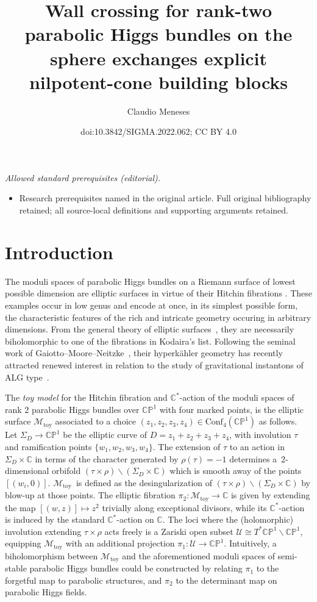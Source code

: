 \documentclass[10pt,a4paper]{amsart}
\title{Wall crossing for rank-two parabolic Higgs bundles on the sphere exchanges explicit nilpotent-cone building blocks}
\author{Claudio Meneses}
\date{doi:10.3842/SIGMA.2022.062; CC BY 4.0}
\newcommand{\field}[1]{\ensuremath{\mathbb{#1}}}
\newcommand{\CC}{\field{C}}
\newcommand{\PP}{\field{P}}
\newcommand{\curly}[1]{\mathscr{#1}}
\newcommand{\cM}{\curly{M}}
\newcommand{\cU}{\curly{U}}
\numberwithin{equation}{section}
\begin{document}
\maketitle
\noindent\textit{Allowed standard prerequisites (editorial).}\begin{itemize}
\item Research prerequisites named in the original article. Full original bibliography retained; all source-local definitions and supporting arguments retained.
\end{itemize}\medskip
\section{Introduction}

The moduli spaces of parabolic Higgs bundles on a Riemann surface of lowest possible dimension are elliptic surfaces in virtue of their Hitchin fibrations \cite{Hit87a}. These examples occur in low genus and encode at once, in its simplest possible form, the characteristic features of the rich and intricate geometry occuring in arbitrary dimensions. From the general theory of elliptic surfaces~\cite{Mir89}, they are necessarily biholomorphic to one of the fibrations in Kodaira's list. Following the seminal work of Gaiotto--Moore--Neitzke~\cite{GMN13}, their hyperk\"ahler geometry has recently attracted renewed interest in relation to the study of gravitational instantons of ALG type~\cite{FMSW22}.

The \textit{toy model} \cite{Hau98} for the Hitchin fibration and $\CC^{*}$-action of the moduli spaces of rank 2 parabolic Higgs bundles over $\CC\PP^{1}$ with four marked points, is the elliptic surface $\cM_{\mathrm{toy}}$ associated to a choice $(z_{1},z_{2},z_{3},z_{4})\in\mathrm{Conf}_{4}(\CC\PP^{1})$ as follows. Let $\Sigma_{D}\rightarrow \CC\PP^{1}$ be the elliptic curve of $D=z_{1}+z_{2}+z_{3}+z_{4}$, with involution $\tau$ and ramification points $\{w_{1},w_{2},w_{3},w_{4}\}$. The extension of $\tau$ to an action in $\Sigma_{D}\times \CC$ in terms of the character generated by $\rho(\tau) = -1$ determines a~2-dimensional orbifold $(\tau\times\rho) \backslash (\Sigma_{D}\times \CC)$ which is smooth away of the points $[(w_{i},0)]$. $\cM_{\mathrm{toy}}$~is defined as the desingularization of $(\tau\times\rho) \backslash (\Sigma_{D}\times \CC)$ by blow-up at those points. The elliptic fibration $\pi_{2}\colon\cM_{\mathrm{toy}}\rightarrow \CC$ is given by extending the map $[(w,z)]\mapsto z^{2}$ trivially along exceptional divisors, while its $\CC^{*}$-action is induced by the standard $\CC^{*}$-action on $\CC$. The loci where the (holomorphic) involution extending $\tau\times\rho$ acts freely is a Zariski open subset $\cU\cong T^{*}\CC\PP^{1}\backslash\CC\PP^{1}$, equipping $\cM_{\mathrm{toy}}$ with an additional projection $\pi_{1}\colon \cU\rightarrow\CC\PP^{1}$. Intuitively, a biholomorphism between $\cM_{\mathrm{toy}}$ and the aforementioned moduli spaces of semi-stable parabolic Higgs bundles could be constructed by relating $\pi_{1}$ to the forgetful map to parabolic structures, and $\pi_{2}$ to the determinant map on parabolic Higgs fields.
\end{document}
